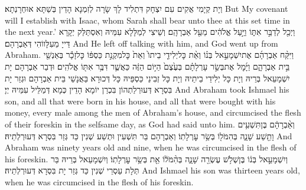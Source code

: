 {וְיָת קְיָמִי אֲקִים עִם יִצְחָק דִּתְלִיד לָךְ שָׂרָה לְזִמְנָא הָדֵין בְּשַׁתָּא אוּחְרָנְתָא׃}
{But My covenant will I establish with Isaac, whom Sarah shall bear unto thee at this set time in the next year.’}{}
{וַיְכַ֖ל לְדַבֵּ֣ר אִתּ֑וֹ וַיַּ֣עַל אֱלֹהִ֔ים מֵעַ֖ל אַבְרָהָֽם׃}
{וְשֵׁיצִי לְמַלָּלָא עִמֵּיהּ וְאִסְתַּלַּק יְקָרָא דַּייָ מֵעִלָּווֹהִי דְּאַבְרָהָם׃}
{And He left off talking with him, and God went up from Abraham.}{}
{וַיִּקַּ֨ח אַבְרָהָ֜ם אֶת\maqqaf יִשְׁמָעֵ֣אל בְּנ֗וֹ וְאֵ֨ת כׇּל\maqqaf יְלִידֵ֤י בֵיתוֹ֙ וְאֵת֙ כׇּל\maqqaf מִקְנַ֣ת כַּסְפּ֔וֹ כׇּל\maqqaf זָכָ֕ר בְּאַנְשֵׁ֖י בֵּ֣ית אַבְרָהָ֑ם וַיָּ֜מׇל אֶת\maqqaf בְּשַׂ֣ר עָרְלָתָ֗ם בְּעֶ֙צֶם֙ הַיּ֣וֹם הַזֶּ֔ה כַּאֲשֶׁ֛ר דִּבֶּ֥ר אִתּ֖וֹ אֱלֹהִֽים׃}
{וּדְבַר אַבְרָהָם יָת יִשְׁמָעֵאל בְּרֵיהּ וְיָת כָּל יְלִידֵי בֵיתֵיהּ וְיָת כָּל זְבִינֵי כַּסְפֵּיהּ כָּל דְּכוּרָא בַּאֲנָשֵׁי בֵּית אַבְרָהָם וּגְזַר יָת בִּסְרָא דְּעוּרְלַתְהוֹן בִּכְרַן יוֹמָא הָדֵין כְּמָא דְּמַלֵּיל עִמֵּיהּ יְיָ׃}
{And Abraham took Ishmael his son, and all that were born in his house, and all that were bought with his money, every male among the men of Abraham’s house, and circumcised the flesh of their foreskin in the selfsame day, as God had said unto him.}{}
{וְאַ֨בְרָהָ֔ם בֶּן\maqqaf תִּשְׁעִ֥ים וָתֵ֖שַׁע שָׁנָ֑ה בְּהִמֹּל֖וֹ בְּשַׂ֥ר עׇרְלָתֽוֹ׃}
{וְאַבְרָהָם בַּר תִּשְׁעִין וּתְשַׁע שְׁנִין כַּד גְּזַר בִּסְרָא דְּעוּרְלְתֵיהּ׃}
{And Abraham was ninety years old and nine, when he was circumcised in the flesh of his foreskin.}{}
{וְיִשְׁמָעֵ֣אל בְּנ֔וֹ בֶּן\maqqaf שְׁלֹ֥שׁ עֶשְׂרֵ֖ה שָׁנָ֑ה בְּהִ֨מֹּל֔וֹ אֵ֖ת בְּשַׂ֥ר עׇרְלָתֽוֹ׃}
{וְיִשְׁמָעֵאל בְּרֵיהּ בַּר תְּלָת עַסְרֵי שְׁנִין כַּד גְּזַר יָת בִּסְרָא דְּעוּרְלְתֵיהּ׃}
{And Ishmael his son was thirteen years old, when he was circumcised in the flesh of his foreskin.}{}
